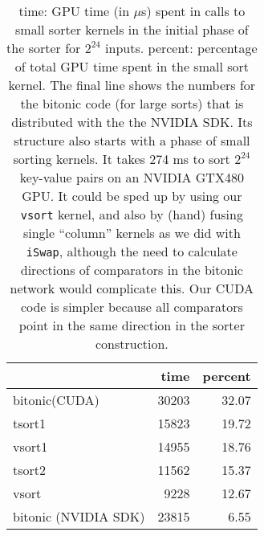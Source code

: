 

\begin{table}
\begin{center}
  \begin{tabular}{| l | r | r |   }

    \hline
                              & time & percent \\ \hline
    bitonic(CUDA)             & 30203 & 32.07\\
    tsort1                    & 15823 & 19.72  \\
    vsort1                       & 14955 & 18.76 \\ 
    tsort2                      & 11562 & 15.37    \\ 
    vsort                       & 9228 &  12.67 \\ 
    bitonic (NVIDIA SDK)        & 23815 & 6.55 \\
    \hline
  \end{tabular}
\end{center}
\label{tab:expressive-table2}
\caption{time: GPU time (in $\mu$s) spent in calls to small sorter kernels 
in the initial phase of the sorter for $2^{24}$ inputs. percent: percentage 
of total GPU time spent in the small sort kernel.
The final line shows the numbers for the bitonic code (for large sorts) that 
is distributed with the the NVIDIA SDK. Its structure also starts with a phase 
of small sorting kernels. It takes 274 ms to sort $2^{24}$ key-value pairs on 
an NVIDIA GTX480 GPU. It could be sped up by using our {\tt vsort} kernel, 
and also by (hand) fusing single ``column'' kernels as we did with {\tt iSwap}, 
although the need to calculate directions of comparators in the bitonic network 
would complicate this. Our CUDA code is simpler because all comparators
point in the same direction in the sorter construction.
} 
\end{table}






